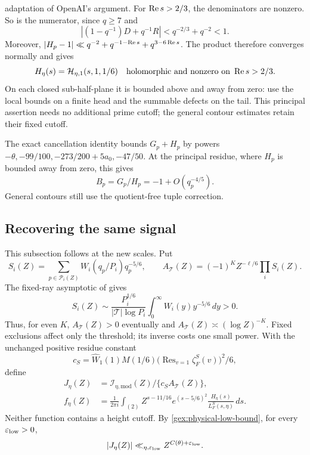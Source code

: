 adaptation of OpenAI's argument.
For $\operatorname{Re} s>2/3$, the denominators are nonzero. So is the numerator,
since $q\ge7$ and
\[
 |(1-q^{-1})D+q^{-1}R|<q^{-2/3}+q^{-2}<1.
\]
Moreover, $|H_p-1|\ll q^{-2}+q^{-1-\operatorname{Re} s}+q^{3-6\operatorname{Re} s}$.
The product therefore converges normally and gives
\begin{equation}\label{gex:principal-nonvanishing}
 H_\eta(s)=\mathcal H_{\eta,1}(s,1,1/6)
 \quad\text{holomorphic and nonzero on }\operatorname{Re} s>2/3.
\end{equation}
On each closed sub-half-plane it is bounded above and away from zero:
use the local bounds on a finite head and the summable defects on the tail.
This principal assertion needs no additional prime cutoff; the general
contour estimates retain their fixed cutoff.

The exact cancellation identity \cite[(16.8)]{OAI26} bounds
\(G_p+H_p\) by powers
\(-\theta,-99/100,-273/200+5a_0,-47/50\). At the principal
residue, where \(H_p\) is bounded away from zero, this gives
\begin{equation}\label{gex:principal-selected-factor}
 B_p=G_p/H_p=-1+O(q_p^{-4/5}).
\end{equation}
General contours still use the quotient-free tuple correction.

\subsection{Recovering the same signal}

This subsection follows \cite[Section 20.1]{OAI26} at the new scales.
Put
\[
 S_i(Z)=\sum_{p\in\mathcal P_i(Z)}
 W_i(q_p/P_i)q_p^{-5/6},\qquad
 A_{\mathcal T}(Z)=(-1)^K Z^{-\ell/6}\prod_iS_i(Z).
\]
The fixed-ray asymptotic of \cite[Lemma 13.1]{OAI26} gives
\[
 S_i(Z)\sim\frac{P_i^{1/6}}{|\mathcal T|\log P_i}
       \int_0^\infty W_i(y)y^{-5/6}\,dy>0.
\]
Thus, for even \(K\), \(A_{\mathcal T}(Z)>0\) eventually and
\(A_{\mathcal T}(Z)\asymp(\log Z)^{-K}\). Fixed exclusions
affect only the threshold; its inverse costs one small power.
With the unchanged positive residue constant
\[
 c_S=\widehat W_1(1)M(1/6)
       \bigl(\operatorname{Res}_{v=1}\zeta_F^S(v)\bigr)^2/6,
\]
define
\begin{equation}\label{gex:common-signal}
\begin{split}
 J_\eta(Z)&=\mathcal I_{\eta,\mathrm{mod}}(Z)/
                  \{c_S A_{\mathcal T}(Z)\},\\
 f_\eta(Z)&=\frac1{2\pi i}\int_{(2)}
 Z^{s-11/16}e^{(s-5/6)^2}
       \frac{H_\eta(s)}{L_F^S(s,\eta)}\,ds .
\end{split}
\end{equation}
Neither function contains a height cutoff.
By \eqref{gex:physical-low-bound}, for every \(\varepsilon_{\rm low}>0\),
\begin{equation}\label{gex:normalized-low}
 |J_\eta(Z)|\ll_{\eta,\varepsilon_{\rm low}}Z^{C(\theta)+\varepsilon_{\rm low}}.
\end{equation}

